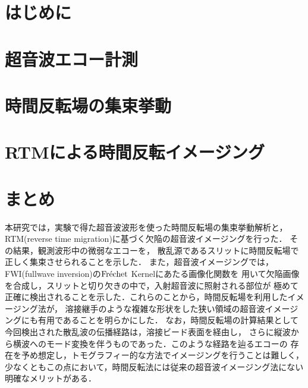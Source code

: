 \documentclass[jscefinal]{jjsce}%
\begin{document}
\section{はじめに}
	
\section{超音波エコー計測}
	
\section{時間反転場の集束挙動}
	
\section{RTMによる時間反転イメージング}
	
\section{まとめ}
本研究では，実験で得た超音波波形を使った時間反転場の集束挙動解析と，
RTM(reverse time migration)に基づく欠陥の超音波イメージングを行った．
その結果，観測波形中の微弱なエコーを，
散乱源であるスリットに時間反転場で正しく集束させられることを示した．
また，超音波イメージングでは，FWI(fullwave inversion)の${\rm Fr\acute{e}chet}$ Kernelにあたる画像化関数を
用いて欠陥画像を合成し，スリットと切り欠きの中で，入射超音波に照射される部位が
極めて正確に検出されることを示した．これらのことから，時間反転場を利用したイメージング法が，
溶接継手のような複雑な形状をした狭い領域の超音波イメージングにも有用であることを明らかにした．
なお，時間反転場の計算結果として今回検出された散乱波の伝播経路は，溶接ビード表面を経由し，
さらに縦波から横波へのモード変換を伴うものであった．このような経路を辿るエコーの
存在を予め想定し，トモグラフィー的な方法でイメージングを行うことは難しく，
少なくともこの点において，時間反転法には従来の超音波イメージング法にない
明確なメリットがある．
\end{document}
